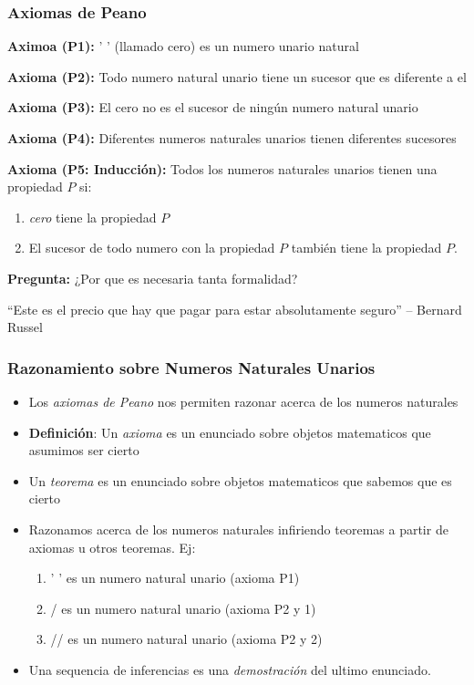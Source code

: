 \documentclass{beamer}
\begin{document}
\begin{frame}
    \frametitle{Axiomas de Peano}
    \begin{itemize}
    \item{{\bf Aximoa (P1): } ' ' (llamado cero) es un numero unario natural}
    \item{{\bf Axioma (P2): } Todo numero natural unario tiene un sucesor que es diferente
    a el}
    \item{{\bf Axioma (P3): }El cero no es el sucesor de ning\'un numero natural unario}
    \item{{\bf Axioma (P4): }Diferentes numeros naturales unarios tienen diferentes sucesores}
    \item{{\bf Axioma (P5: Inducci\'on): }Todos los numeros naturales unarios tienen una propiedad
    $P$ si:
    \begin{enumerate}
        \item{\emph{cero} tiene la propiedad $P$}
        \item{El sucesor de todo numero con la propiedad $P$ tambi\'en tiene la propiedad $P$.}
    \end{enumerate}
    \item{{\bf Pregunta: } ¿Por que es necesaria tanta formalidad?}
    \item{``Este es el precio que hay que pagar para estar absolutamente seguro'' -- Bernard Russel}
    }
\end{itemize}
\end{frame}

\begin{frame}
    \frametitle{Razonamiento sobre Numeros Naturales Unarios}
    \begin{itemize}
        \item{Los \emph{axiomas de Peano} nos permiten razonar acerca de los numeros naturales}
        \item{{\bf Definici\'on}: Un \emph{axioma} es un enunciado sobre objetos matematicos que
        asumimos ser cierto}
        \item{Un \emph{teorema} es un enunciado sobre objetos matematicos que sabemos que es cierto}
        \item{Razonamos acerca de los numeros naturales infiriendo teoremas a partir de axiomas u
        otros teoremas. Ej:
        \begin{enumerate}
            \item{' ' es un numero natural unario (axioma P1)}
            \item{/ es un numero natural unario (axioma P2 y 1)}
            \item{// es un numero natural unario (axioma P2 y 2)}
        \end{enumerate}
        }
        \item{Una sequencia de inferencias es una \emph{demostraci\'on} del ultimo
        enunciado.}
    \end{itemize}
\end{frame}
\end{document}
